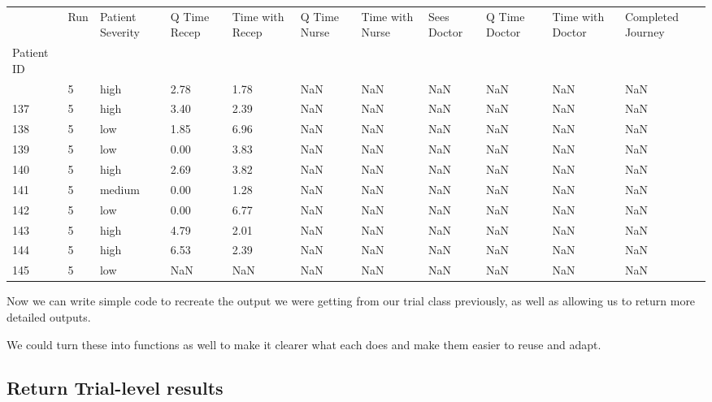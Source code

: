 \documentclass[
  letterpaper,
  DIV=11,
  numbers=noendperiod]{scrreprt}
\begin{document}
\begin{longtable}[]{@{}lllllllllll@{}}
\toprule\noalign{}
& Run & Patient Severity & Q Time Recep & Time with Recep & Q Time Nurse
& Time with Nurse & Sees Doctor & Q Time Doctor & Time with Doctor &
Completed Journey \\
Patient ID & & & & & & & & & & \\
\midrule\noalign{}
\endhead
\bottomrule\noalign{}
\endlastfoot
136 & 5 & high & 2.78 & 1.78 & NaN & NaN & NaN & NaN & NaN & NaN \\
137 & 5 & high & 3.40 & 2.39 & NaN & NaN & NaN & NaN & NaN & NaN \\
138 & 5 & low & 1.85 & 6.96 & NaN & NaN & NaN & NaN & NaN & NaN \\
139 & 5 & low & 0.00 & 3.83 & NaN & NaN & NaN & NaN & NaN & NaN \\
140 & 5 & high & 2.69 & 3.82 & NaN & NaN & NaN & NaN & NaN & NaN \\
141 & 5 & medium & 0.00 & 1.28 & NaN & NaN & NaN & NaN & NaN & NaN \\
142 & 5 & low & 0.00 & 6.77 & NaN & NaN & NaN & NaN & NaN & NaN \\
143 & 5 & high & 4.79 & 2.01 & NaN & NaN & NaN & NaN & NaN & NaN \\
144 & 5 & high & 6.53 & 2.39 & NaN & NaN & NaN & NaN & NaN & NaN \\
145 & 5 & low & NaN & NaN & NaN & NaN & NaN & NaN & NaN & NaN \\
\end{longtable}

Now we can write simple code to recreate the output we were getting from
our trial class previously, as well as allowing us to return more
detailed outputs.

\begin{tcolorbox}[enhanced jigsaw, colframe=quarto-callout-tip-color-frame, bottomtitle=1mm, breakable, rightrule=.15mm, coltitle=black, colbacktitle=quarto-callout-tip-color!10!white, opacityback=0, leftrule=.75mm, arc=.35mm, toptitle=1mm, title=\textcolor{quarto-callout-tip-color}{\faLightbulb}\hspace{0.5em}{Tip}, titlerule=0mm, colback=white, toprule=.15mm, bottomrule=.15mm, left=2mm, opacitybacktitle=0.6]

We could turn these into functions as well to make it clearer what each
does and make them easier to reuse and adapt.

\end{tcolorbox}

\subsection{Return Trial-level
results}\label{return-trial-level-results}
\end{document}
